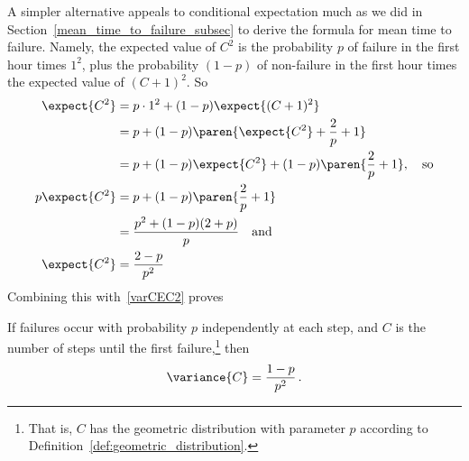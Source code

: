 A simpler alternative appeals to conditional expectation much as we
did in Section~\ref{mean_time_to_failure_subsec} to derive the formula
for mean time to failure.  Namely, the expected value of $C^2$ is the
probability $p$ of failure in the first hour times $1^2$, plus the
probability $(1-p)$ of non-failure in the first hour times the
expected value of $(C+1)^2$.  So
\begin{align*}
\expect{C^2} & = p\cdot 1^2 + (1-p)\expect{(C+1)^2}\\
             & = p + (1-p) \paren{\expect{C^2} + \frac{2}{p} +1}\\
             & = p+ (1-p)\expect{C^2} + (1-p)\paren{\frac{2}{p} + 1},
                \quad\text{so}\\
p \expect{C^2} & = p+ (1-p)\paren{\frac{2}{p} + 1}\\
               & = \frac{p^2+(1-p)(2+p)}{p} \quad\text{and}\\
\expect{C^2} & = \frac{2 -p}{p^2} %
\end{align*}
Combining this with~\eqref{varCEC2} proves
\begin{lemma}\label{lem:var_time_to_fail}
If failures occur with probability $p$ independently at each step, and
$C$ is the number of steps until the first failure,\footnote{That is,
  $C$ has the geometric distribution with parameter $p$ according to
  Definition~\ref{def:geometric_distribution}.} then
\begin{equation}\label{var_time_to_fail}
\variance{C} = \frac{1-p}{p^2} \,.
\end{equation}
\end{lemma}

